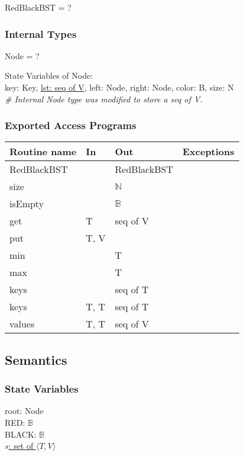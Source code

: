 \documentclass[12pt]{article}
\begin{document}
RedBlackBST = ?

\subsubsection* {Internal Types}

Node = ?

\noindent State Variables of Node:\\
key: Key,
\underline {lst: seq of V},
left: Node,
right: Node,
color: B,
size: N\\

\noindent \textit{\# Internal Node type was modified to store a seq of V.}

\subsubsection* {Exported Access Programs}

\begin{tabular}{| l | l | l | l |}
\hline
\textbf{Routine name} & \textbf{In} & \textbf{Out} & \textbf{Exceptions}\\
\hline
RedBlackBST & ~ & RedBlackBST & \\
\hline
size & ~ & $\mathbb{N}$ & ~\\
\hline
isEmpty & ~ & $\mathbb{B}$ & ~\\
\hline
get & T & seq of V & ~\\
\hline
put & T, V & ~ & ~\\
\hline
min & ~ & T & ~\\
\hline
max & ~ & T & ~\\
\hline
keys & ~ & seq of T & ~\\
\hline
keys &  T, T & seq of T & ~\\
\hline
values & T, T & seq of V & ~\\
\hline
\end{tabular}

\subsection* {Semantics}

\subsubsection* {State Variables}

root: Node\\
RED: $\mathbb{B}$\\
BLACK: $\mathbb{B}$\\
\underline{$s$: set of $\langle T, V \rangle$}\\
\end{document}
